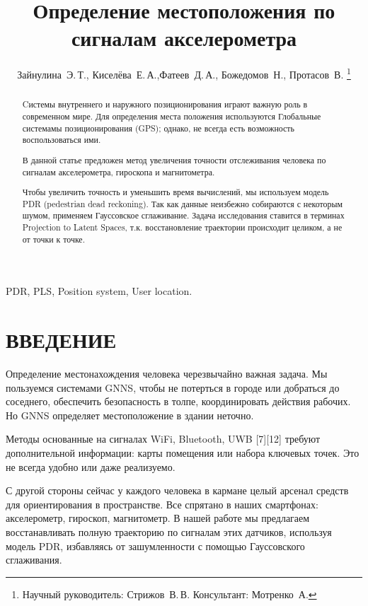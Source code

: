 \documentclass[letterpaper, 10 pt, conference]{ieeeconf}  %
\title{\LARGE \bf
Определение местоположения по сигналам акселерометра
}
\author{Зайнулина~Э.\,Т., Киселёва~Е.\,А.,Фатеев~Д.\,А.,
    Божедомов~Н.,
    Протасов~В.%
\thanks
    {
   Научный руководитель:  Стрижов~В.\,В.
    Консультант:  Мотренко~А.}
    }
\begin{document}
\maketitle
\thispagestyle{empty}
\pagestyle{empty}


\begin{abstract}
Cистемы внутреннего и наружного позиционирования играют важную роль в современном мире. Для определения места положения используются Глобальные системамы позиционирования (GPS); однако, не всегда есть возможность воспользоваться ими.

В данной статье предложен метод увеличения точности отслеживания человека по сигналам акселерометра, гироскопа и магнитометра.

Чтобы увеличить точность и уменьшить время вычислений, мы используем модель PDR (pedestrian dead reckoning). Так как данные неизбежно собираются с некоторым шумом, применяем Гауссовское сглаживание. Задача исследования ставится в терминах Projection to Latent Spaces, т.к. восстановление траектории происходит целиком, а не от точки к точке.
\end{abstract}
\begin{keywords}
PDR, PLS, Position system, User location.
\end{keywords}

\section{ВВЕДЕНИЕ}
Определение местонахождения человека черезвычайно важная задача. Мы пользуемся системами GNNS, чтобы не потерться в городе или добраться до соседнего, обеспечить безопасность в толпе, координировать действия рабочих. Но GNNS определяет местоположение в здании неточно.

Методы основанные на сигналах WiFi, Bluetooth, UWB [7][12] требуют дополнительной информации: карты помещения или набора ключевых точек. Это не всегда удобно или даже реализуемо.

С другой стороны сейчас у каждого человека в кармане целый арсенал средств для ориентирования в пространстве. Все спрятано в наших смартфонах: акселерометр, гироскоп, магнитометр. В нашей работе мы предлагаем восстанавливать полную траекторию по сигналам этих датчиков, используя модель PDR, избавляясь от зашумленности с помощью Гауссовского сглаживания.
\end{document}
